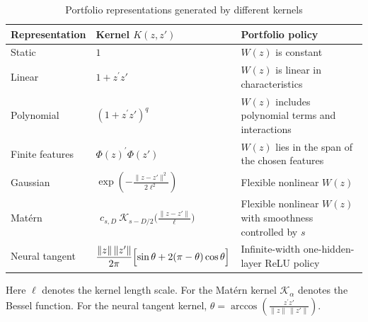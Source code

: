 \begin{table}[H]
\centering
\caption{Portfolio representations generated by different kernels}
\label{tab:kernel_policy_classes}
\small
\renewcommand{\arraystretch}{1.25}

\begin{tabular}{
p{}
p{}
p{}
}
\toprule
Representation & Kernel $K(z,z')$ & Portfolio policy\\
\midrule

Static
&
$1$
&
$W(z)$ is constant
\\[4pt]

Linear
&
$1+z^\prime z'$
&
$W(z)$ is linear in characteristics
\\[4pt]

Polynomial
&
$(1+z^\prime z')^q$
&
$W(z)$ includes polynomial terms and interactions
\\[6pt]

Finite features
&
$\Phi(z)^\prime\Phi(z')$
&
$W(z)$ lies in the span of the chosen features
\\[4pt]



Gaussian
&
$\displaystyle
\exp\!\left(
-\frac{\|z-z'\|^2}{2\ell^2}
\right)$
&
Flexible nonlinear $W(z)$
\\[8pt]

Mat\'ern
&
$\displaystyle
\begin{aligned}
c_{s,D}\
\mathcal K_{s-D/2}
\!\bigl(\frac{\|z-z'\|}{\ell}\bigr)
\end{aligned}$
&
Flexible nonlinear $W(z)$ with smoothness controlled by $s$
\\[10pt]

Neural tangent
&
$\displaystyle
\begin{aligned}
\frac{\|z\|\,\|z'\|}{2\pi}
\Bigl[\sin\theta
+2(\pi-\theta)\cos\theta
\Bigr]
\end{aligned}$
&
Infinite-width one-hidden-layer ReLU policy
\\

\bottomrule
\end{tabular}

\begin{minipage}{0.97\textwidth}
Here $\ell$ denotes the kernel length scale. For the Mat\'ern kernel $\mathcal K_\alpha$ denotes the Bessel function.
For the neural tangent kernel,
$
\theta
=
\arccos\!\left(
\frac{z^\prime z'}
{\|z\|\,\|z'\|}
\right).
$
\end{minipage}
\end{table}